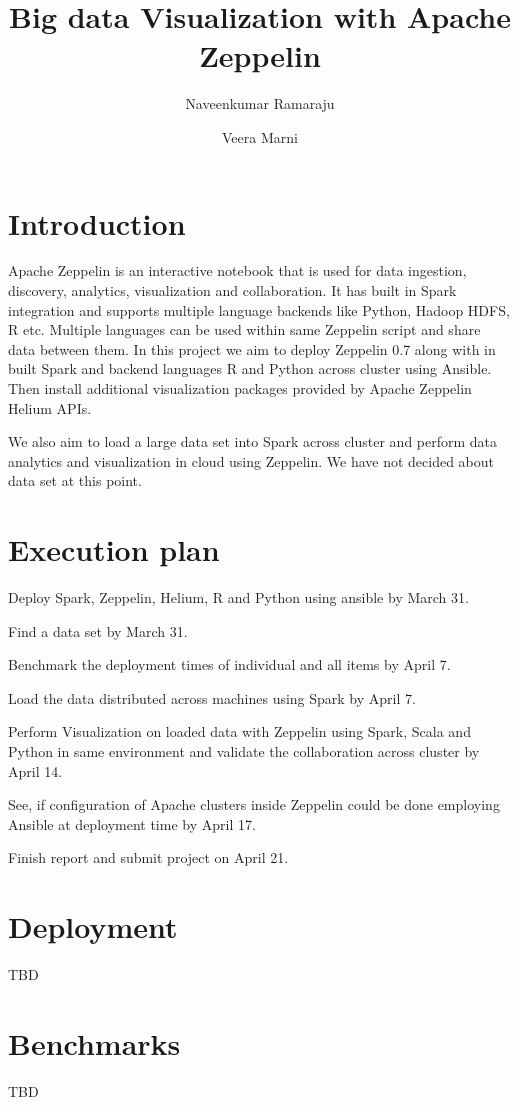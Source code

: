 \documentclass[9pt,twocolumn,twoside]{styles/osajnl}
\title{Big data Visualization with Apache Zeppelin}
\author[1, *]{Naveenkumar Ramaraju}
\author[1,*]{Veera Marni}
\affil[1]{School of Informatics and Computing, Bloomington, IN 47408, U.S.A.}
\affil[*]{Corresponding authors: naveenkumar2703@gmail.com, narayana1043@gmail.com}
\begin{document}
\maketitle

\section{Introduction}

Apache Zeppelin\cite{www-zeppelin}  is an interactive notebook that is used for data ingestion, discovery, analytics, visualization and collaboration. It has built in Spark integration and supports multiple language backends like Python, Hadoop HDFS, R etc.  Multiple languages can be used within same Zeppelin script and share data between them. In this project we aim to deploy Zeppelin 0.7 along with in built Spark and backend languages R and Python across cluster using Ansible. Then install additional  visualization packages provided by Apache Zeppelin Helium APIs. 

We also aim to load a large data set into Spark across cluster and perform data analytics and visualization in cloud using Zeppelin. We have not decided about data set at this point.

\section{Execution plan}

Deploy Spark, Zeppelin, Helium, R and Python using ansible by March 31.

Find a  data set by March 31.

Benchmark the deployment times of individual and all items by April 7.

Load the data distributed across machines using Spark by April 7.

Perform Visualization on loaded data with Zeppelin using Spark, Scala and Python in same environment and validate the collaboration across cluster by April 14.

See, if configuration of Apache clusters inside Zeppelin could be done employing Ansible at deployment time by April 17.

Finish report and submit project on April 21.


\section{Deployment}
TBD

\section{Benchmarks}
TBD
\end{document}
